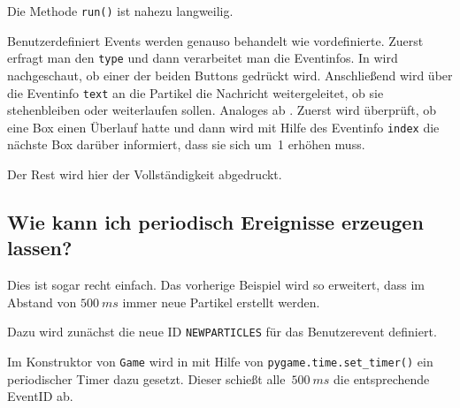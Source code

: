 
Die Methode \texttt{run()} ist nahezu langweilig.


Benutzerdefiniert Events werden genauso behandelt wie vordefinierte. Zuerst erfragt man den \texttt{type} und dann verarbeitet man die Eventinfos. In  wird nachgeschaut, ob einer der beiden Buttons gedrückt wird. Anschließend wird über die Eventinfo \texttt{text} an die Partikel die Nachricht weitergeleitet, ob sie stehenbleiben oder weiterlaufen sollen. Analoges ab . Zuerst wird überprüft, ob eine Box einen Überlauf hatte und dann wird mit Hilfe des Eventinfo \texttt{index} die nächste Box darüber informiert, dass sie sich um~1 erhöhen muss.


Der Rest wird hier der Vollständigkeit abgedruckt.


\subsection{Wie kann ich periodisch Ereignisse erzeugen lassen?}\label{eventtime}

Dies ist sogar recht einfach. Das vorherige Beispiel wird so erweitert, dass im Abstand von $500~ms$ immer neue Partikel erstellt werden.

Dazu wird zunächst die neue ID \texttt{NEWPARTICLES} für das Benutzerevent definiert.


Im Konstruktor von \texttt{Game} wird in  mit Hilfe von \texttt{pygame.time.set\_timer()} ein periodischer Timer dazu gesetzt. Dieser schießt alle~$500~ms$ die entsprechende EventID ab.



